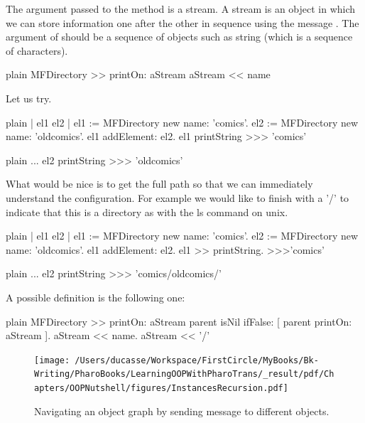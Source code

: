 \documentclass[10pt,twoside,english]{_support/latex/sbabook/sbabook}
\begin{document}
The argument passed to the method  is a stream. A stream is an object in which we can store information one after the other in sequence using the message \textcode{\textless{}\textless{}}. The argument of \textcode{\textless{}\textless{}} should be a sequence of objects such as string (which is a sequence of characters).

\begin{displaycode}{plain}
MFDirectory >> printOn: aStream
	aStream << name
\end{displaycode}

Let us try. 

\begin{displaycode}{plain}
| el1 el2 |
el1 := MFDirectory new name: 'comics'.
el2 := MFDirectory new name: 'oldcomics'.
el1 addElement: el2.
el1 printString
>>> 'comics'
\end{displaycode}

\begin{displaycode}{plain}
	...
el2 printString
>>> 'oldcomics'
\end{displaycode}

What would be nice is to get the full path so that we can immediately understand the configuration.
For example we would like to  finish with a '/' to indicate that this is a directory as with the ls command on unix. 

\begin{displaycode}{plain}
| el1 el2 |
el1 := MFDirectory new name: 'comics'.
el2 := MFDirectory new name: 'oldcomics'.
el1 addElement: el2.
el1 >> printString.
>>>'comics'
\end{displaycode}

\begin{displaycode}{plain}
	...
el2 printString
>>> 'comics/oldcomics/'
\end{displaycode}

A possible definition is the following one:

\begin{displaycode}{plain}
MFDirectory >> printOn: aStream
	parent isNil 
		ifFalse: [ parent printOn: aStream ].
	aStream << name.
	aStream << '/'
\end{displaycode}


\begin{figure}

\begin{center}
\texttt{[image: /Users/ducasse/Workspace/FirstCircle/MyBooks/Bk-Writing/PharoBooks/LearningOOPWithPharoTrans/\_result/pdf/Chapters/OOPNutshell/figures/InstancesRecursion.pdf]}\caption{Navigating an object graph by sending message to different objects. \label{InstancesRecursion}}\end{center}
\end{figure}
\end{document}
